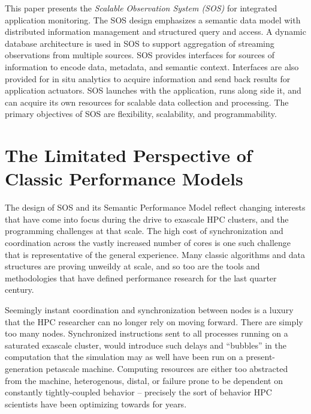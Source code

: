This paper presents the \textit{Scalable Observation System (SOS)} for
integrated application monitoring.
%
The SOS design emphasizes a semantic data model with distributed
information management and structured query and access.
%
A dynamic database architecture is used in SOS to support aggregation
of streaming observations from multiple sources.
%
SOS provides interfaces for sources of information to encode data,
metadata, and semantic context.
%
Interfaces are also provided for in situ analytics to acquire
information and send back results for application actuators.
%
SOS launches with the application, runs along side it, and can acquire
its own resources for scalable data collection and processing.
%
The primary objectives of SOS are flexibility, scalability, and
programmability.


\section{The Limitated Perspective of Classic Performance Models}

The design of SOS and its Semantic Performance Model reflect changing
interests that have come into focus during the drive to exascale HPC
clusters, and the programming challenges at that scale.
%
The high cost of synchronization and coordination across the vastly
increased number of cores is one such challenge that is representative
of the general experience.
%
Many classic algorithms and data structures are proving unweildy at
scale, and so too are the tools and methodologies that have defined
performance research for the last quarter century.

Seemingly instant coordination and synchronization between nodes is a
luxury that the HPC researcher can no longer rely on moving
forward.
%
There are simply too many nodes. Synchronized instructions sent to all
processes running on a saturated exascale cluster, would introduce
such delays and ``bubbles'' in the computation that the simulation may
as well have been run on a present-generation petascale machine.
%
Computing resources are either too abstracted from the machine,
heterogenous, distal, or failure prone to be dependent on constantly
tightly-coupled behavior -- precisely the sort of behavior HPC
scientists have been optimizing towards for years.

